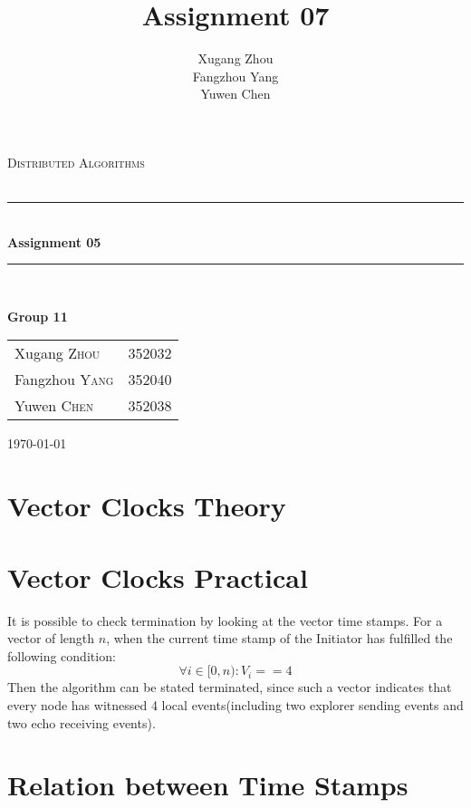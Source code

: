 \documentclass[a4paper, 14pt]{article}
\title{\bf Assignment 07}
\author{Xugang Zhou \\ Fangzhou Yang \\ Yuwen Chen}
\newcommand{\HRule}{\rule{\linewidth}{0.5mm}}
\begin{document}
\begin{titlepage}
\begin{center}
\vfill
\textsc{\LARGE Distributed Algorithms}\\[1.5cm]
\textsc{\Large }\\[0.5cm]

\HRule \\[0.4cm]
{\huge \bfseries Assignment 05}\\[0.4cm]
\HRule \\[1.5cm]
\begin{minipage}{0.4\textwidth}
\begin{flushleft} \large
\large{\textbf{Group 11}}
\end{flushleft}
\end{minipage}
\begin{minipage}{0.4\textwidth}
\begin{flushright} \large
\begin{tabular}{ll}
Xugang \textsc{Zhou} & 352032\\
Fangzhou \textsc{Yang} & 352040\\
Yuwen \textsc{Chen} & 352038
\end{tabular}
\end{flushright}
\end{minipage}
\vfill
{\large \today}\\
\end{center}
\end{titlepage}
\thispagestyle{fancy}

\section{Vector Clocks Theory}

\section{Vector Clocks Practical}

It is possible to check termination by looking at the vector time stamps. For a vector of length $n$, when the current time stamp of the Initiator has fulfilled the following condition:
\[ \forall i \in [0,n): V_i == 4\]
Then the algorithm can be stated terminated, since such a vector indicates that every node has witnessed 4 local events(including two explorer sending events and two echo receiving events).

\section{Relation between Time Stamps}
\end{document}
